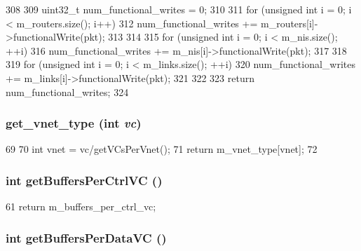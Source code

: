 \begin{DoxyCode}
308 {
309     uint32_t num_functional_writes = 0;
310 
311     for (unsigned int i = 0; i < m_routers.size(); i++) {
312         num_functional_writes += m_routers[i]->functionalWrite(pkt);
313     }
314 
315     for (unsigned int i = 0; i < m_nis.size(); ++i) {
316         num_functional_writes += m_nis[i]->functionalWrite(pkt);
317     }
318 
319     for (unsigned int i = 0; i < m_links.size(); ++i) {
320         num_functional_writes += m_links[i]->functionalWrite(pkt);
321     }
322 
323     return num_functional_writes;
324 }
\end{DoxyCode}
\hypertarget{classGarnetNetwork__d_abbe1c40bc7bb2c9945a382bb3ac61623}{
\subsubsection[{get\_\-vnet\_\-type}]{ get\_\-vnet\_\-type (int {\em vc})}}
\label{classGarnetNetwork__d_abbe1c40bc7bb2c9945a382bb3ac61623}



\begin{DoxyCode}
69     {
70         int vnet = vc/getVCsPerVnet();
71         return m_vnet_type[vnet];
72     }
\end{DoxyCode}
\hypertarget{classGarnetNetwork__d_abe1fcc65653425dc91b3e0f9d5957301}{
\subsubsection[{getBuffersPerCtrlVC}]{\setlength{\rightskip}{0pt plus 5cm}int getBuffersPerCtrlVC ()}}
\label{classGarnetNetwork__d_abe1fcc65653425dc91b3e0f9d5957301}



\begin{DoxyCode}
61 {return m_buffers_per_ctrl_vc; }
\end{DoxyCode}
\hypertarget{classGarnetNetwork__d_a5331e3490818aa99a618a3e54b08acc9}{
\subsubsection[{getBuffersPerDataVC}]{\setlength{\rightskip}{0pt plus 5cm}int getBuffersPerDataVC ()}}
\label{classGarnetNetwork__d_a5331e3490818aa99a618a3e54b08acc9}



